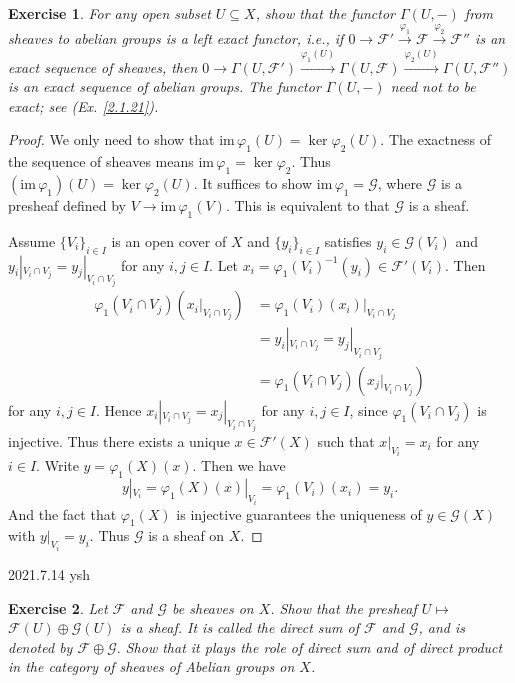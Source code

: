 \documentclass{amsart}
\newtheorem{exe}{Exercise}[subsection]
\begin{document}
\begin{exe}
	\label{2.1.8}
	For any open subset $U\subseteq X$, show that the functor $\Gamma(U,-)$ from sheaves to abelian groups is a left exact functor, i.e., if $0{\longrightarrow}\mathscr{F}'\xrightarrow{\varphi_1}\mathscr{F}\xrightarrow{\varphi_2}\mathscr{F}''$ is an exact sequence of sheaves, then $0{\longrightarrow}\Gamma(U,\mathscr{F}')\xrightarrow{\varphi_1(U)}{}\Gamma(U,\mathscr{F})\xrightarrow{\varphi_2(U)}{}\Gamma(U,\mathscr{F}'')$ is an exact sequence of abelian groups. The functor $\Gamma(U,-)$ need not to be exact; see \textup{(Ex. \ref{2.1.21})}.
\end{exe}

\begin{proof}
	We only need to show that $\mathrm{im}\,\varphi_1(U)=\ker\varphi_2(U)$. The exactness of the sequence of sheaves means $\mathrm{im}\,\varphi_1=\ker\varphi_2$. Thus $(\mathrm{im}\,\varphi_1)(U)=\ker\varphi_2(U)$. It suffices to show $\mathrm{im}\,\varphi_1=\mathscr{G}$, where $\mathscr{G}$ is a presheaf defined by $V\to\mathrm{im}\,\varphi_1(V)$. This is equivalent to that $\mathscr{G}$ is a sheaf.
	
	Assume $\{V_i\}_{i\in I}$ is an open cover of $X$ and $\{y_i\}_{i\in I}$ satisfies $y_i\in\mathscr{G}(V_i)$ and $y_i|_{V_i\cap V_j}=y_j|_{V_i\cap V_j}$ for any $i,j\in I$. Let $x_i=\varphi_1(V_i)^{-1}(y_i)\in\mathscr{F}'(V_i)$. Then 
	\begin{align*}
	\varphi_1(V_i\cap V_j)(x_i|_{V_i\cap V_j})&=\varphi_1(V_i)(x_i)|_{V_i\cap V_j}\\
	&=y_i|_{V_i\cap V_j}=y_j|_{V_i\cap V_j}\\
	&=\varphi_1(V_i\cap V_j)(x_j|_{V_i\cap V_j})
	\end{align*}
	for any $i,j\in I$. Hence $x_i|_{V_i\cap V_j}=x_j|_{V_i\cap V_j}$ for any $i,j\in I$, since $\varphi_1(V_i\cap V_j)$ is injective. Thus there exists a unique $x\in\mathscr{F}'(X)$ such that $x|_{V_i}=x_i$ for any $i\in I$. Write $y=\varphi_1(X)(x)$. Then we have $$y|_{V_i}=\varphi_1(X)(x)|_{V_i}=\varphi_1(V_i)(x_i)=y_i.$$ And the fact that $\varphi_1(X)$ is injective guarantees the uniqueness of $y\in\mathscr{G}(X)$ with $y|_{V_i}=y_i$. Thus $\mathscr{G}$ is a sheaf on $X$.
\end{proof}

2021.7.14 ysh
\begin{exe}
               Let $\mathscr{F}$ and $\mathscr{G}$ be sheaves on $X$. Show that the presheaf $U \mapsto$ $\mathscr{F}(U) \oplus \mathscr{G}(U)$ is a sheaf. It is called the direct sum of $\mathscr{F}$ and $\mathscr{G}$, and is denoted by $\mathscr{F} \oplus \mathscr{G} .$ Show that it plays the role of direct sum and of direct product in the category of sheaves of Abelian groups on $X$.
\end{exe}
\end{document}
